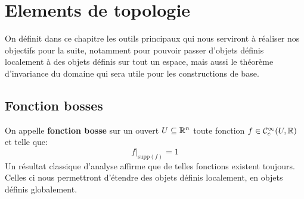 \chapter{Elements de topologie}
On définit dans ce chapitre les outils principaux qui nous serviront à réaliser nos objectifs pour la suite, notamment pour pouvoir passer d'objets définis localement à des objets définis sur tout un espace, mais aussi le théorème d'invariance du domaine qui sera utile pour les constructions de base.
\section{Fonction bosses}
On appelle \textbf{fonction bosse} sur un ouvert \( U \subseteq \mathbb{R}^n \) toute fonction \( f \in \mathcal{C}^\infty_c(U, \mathbb{R}) \) et telle que:
\[ 
   f\big|_{\text{supp}(f)} = 1 
\]
Un résultat classique d'analyse affirme que de telles fonctions existent toujours. Celles ci nous permettront d'étendre des objets définis localement, en objets définis globalement.
